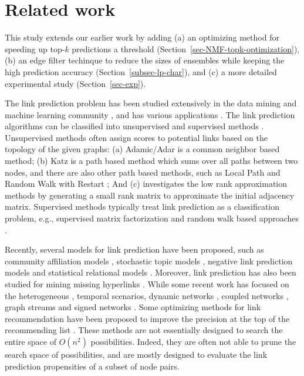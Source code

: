 \section{Related work}
\label{sec-related}

This study extends our earlier work \cite{liang2016} by adding
(a) an optimizing method for speeding up top-$k$ predictions \wrt a threshold (Section~\ref{sec-NMF-topk-optimization}), (b) an edge filter techinque to reduce the sizes of ensembles while keeping the high prediction accuracy (Section~\ref{subsec-lp-char}), and (c) a more detailed experimental study (Section~\ref{sec-exp}).




The link prediction problem has been studied extensively in the data mining and machine learning community
\cite{kleinberg,linyuan-2011}, and has various applications  \cite{adom,kunegis,kleinberg,barbieri2014,back,tang2015}.
The link prediction algorithms can be classified into unsupervised and supervised methods \cite{propflow}. Unsupervised methods
often assign scores to potential links based on the topology of the given graphs:
(a) Adamic/Adar \cite{adamic} is a common neighbor based method; (b) Katz \cite{katz-1953} is a
path based method which sums over all paths between two nodes, and there are also other path based
methods, such as Local Path and Random Walk with Restart \cite{linyuan-2011}; And (c)
\cite{kunegis,kleinberg, zhai2015}  investigates the low rank approximation methods by generating a
small rank matrix to approximate the initial adjacency matrix. Supervised methods
\cite{Link09,propflow,chen2015} typically treat link prediction as a classification problem, e.g., supervised matrix factorization and random walk based approaches \cite{menon,back}.

Recently, several models for link prediction have been proposed,
such as  community affiliation models \cite{yang-wsdm2013}, stochastic topic models \cite{barbieri2014},
negative link prediction models \cite{tang2015} and statistical relational models \cite{bilgic,Getoor01,Getoor02}.
Moreover, link prediction has also been studied for mining
missing hyperlinks \cite{west2015}.
While some recent work has focused on the heterogeneous \cite{yang}, temporal \cite{back,dwang} scenarios, dynamic networks \cite{zhu2016}, coupled networks \cite{dong2015},
graph streams \cite{zhao2016} and signed networks \cite{song2015kdd}. Some optimizing methods for link recommendation have been proposed to improve the precision at the top of the recommending list \cite{song2015}.
These methods are not essentially
designed to search the entire space of $O(n^2)$ possibilities. Indeed, they are often not able to prune the search space of possibilities, and are mostly designed to evaluate the link prediction propensities of a subset of node pairs.

